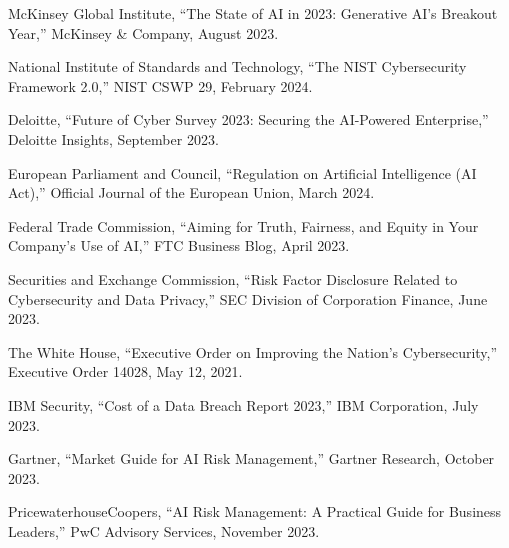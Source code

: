 \documentclass[11pt,letterpaper]{article}
\begin{document}

\begin{thebibliography}{99}

McKinsey Global Institute, ``The State of AI in 2023: Generative AI's Breakout Year,'' McKinsey \& Company, August 2023.

National Institute of Standards and Technology, ``The NIST Cybersecurity Framework 2.0,'' NIST CSWP 29, February 2024.

Deloitte, ``Future of Cyber Survey 2023: Securing the AI-Powered Enterprise,'' Deloitte Insights, September 2023.

European Parliament and Council, ``Regulation on Artificial Intelligence (AI Act),'' Official Journal of the European Union, March 2024.

Federal Trade Commission, ``Aiming for Truth, Fairness, and Equity in Your Company's Use of AI,'' FTC Business Blog, April 2023.

Securities and Exchange Commission, ``Risk Factor Disclosure Related to Cybersecurity and Data Privacy,'' SEC Division of Corporation Finance, June 2023.

The White House, ``Executive Order on Improving the Nation's Cybersecurity,'' Executive Order 14028, May 12, 2021.

IBM Security, ``Cost of a Data Breach Report 2023,'' IBM Corporation, July 2023.

Gartner, ``Market Guide for AI Risk Management,'' Gartner Research, October 2023.

PricewaterhouseCoopers, ``AI Risk Management: A Practical Guide for Business Leaders,'' PwC Advisory Services, November 2023.

\end{thebibliography}
\end{document}
